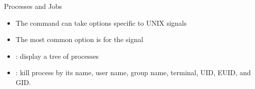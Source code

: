 \documentclass[10pt,t]{beamer}
\begin{document}
\begin{frame}{Processes and Jobs}
\begin{itemize}
    \item The  command can take options specific to UNIX signals
    \item The most common option is  for the  signal
    \item {}: display a tree of processes
    \item {}: kill process by its name, user name, group name, terminal, UID, EUID, and GID.
  \end{itemize}
\end{frame}
\end{document}
